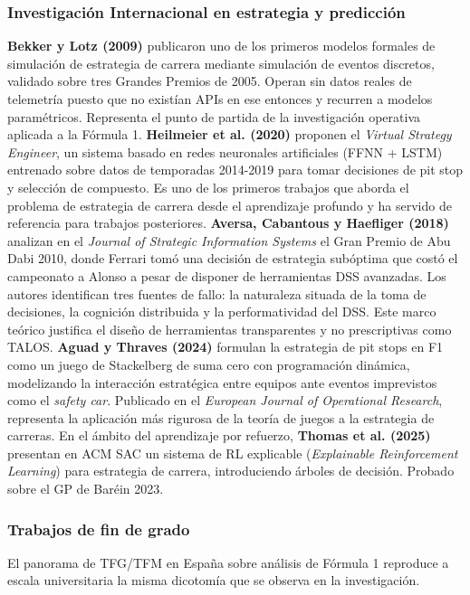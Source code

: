 \documentclass[12pt,a4paper,twoside,openright]{book}
\begin{document}
\subsubsection{Investigación Internacional en estrategia y predicción}
\noindent \textbf{Bekker y Lotz (2009)} \cite{bekker2009} publicaron uno de los primeros modelos formales de simulación de estrategia de carrera mediante simulación de eventos discretos, validado sobre tres Grandes Premios de 2005. Operan sin datos reales de telemetría puesto que no existían APIs en ese entonces y recurren a modelos paramétricos.
Representa el punto de partida de la investigación operativa aplicada a la Fórmula 1.
\medskip
\noindent \textbf{Heilmeier et al. (2020)} \cite{heilmeier2020} proponen el \textit{Virtual Strategy Engineer}, un sistema basado en redes neuronales artificiales (FFNN + LSTM) entrenado sobre datos de temporadas 2014-2019 para tomar decisiones de pit stop y selección de compuesto.
Es uno de los primeros trabajos que aborda el problema de estrategia de carrera desde el aprendizaje profundo y ha servido de referencia para trabajos posteriores.
\medskip
\noindent \textbf{Aversa, Cabantous y Haefliger (2018)} \cite{aversa2018} analizan en el \textit{Journal of Strategic Information Systems} el Gran Premio de Abu Dabi 2010, donde Ferrari tomó una decisión de estrategia subóptima que costó el campeonato a Alonso a pesar de disponer de herramientas DSS avanzadas.
Los autores identifican tres fuentes de fallo: la naturaleza situada de la toma de decisiones, la cognición distribuida y la performatividad del DSS. Este marco teórico justifica el diseño de herramientas transparentes y no prescriptivas como TALOS.
\medskip
\noindent \textbf{Aguad y Thraves (2024)} \cite{aguad2024} formulan la estrategia de pit stops en F1 como un juego de Stackelberg de suma cero con programación dinámica, modelizando la interacción estratégica entre equipos ante eventos imprevistos como el \textit{safety car}. Publicado en el \textit{European Journal of Operational Research}, representa la aplicación más rigurosa de la teoría de juegos a la estrategia de carreras.
\medskip
\noindent En el ámbito del aprendizaje por refuerzo, \textbf{Thomas et al. (2025)} \cite{thomas2025rl} presentan en ACM SAC un sistema de RL explicable (\textit{Explainable Reinforcement Learning}) para estrategia de carrera, introduciendo árboles de decisión. Probado sobre el GP de Baréin 2023.

\subsubsection{Trabajos de fin de grado}
El panorama de TFG/TFM en España sobre análisis de Fórmula 1 reproduce a escala universitaria la misma dicotomía que se observa en la investigación.
\end{document}
